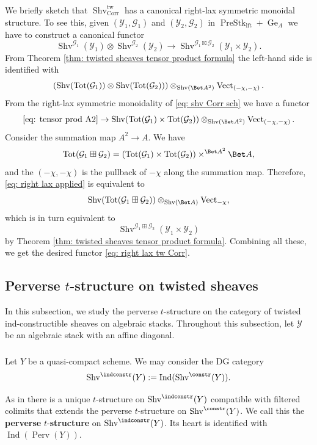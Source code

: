 \documentclass[10pt]{amsart}
\newcommand{\sssec}{\subsubsection}
\theoremstyle{remark}
\newcommand{\on}{\operatorname}
\newcommand{\cG}{\mathcal{G}}
\newcommand{\cY}{\mathcal{Y}}
\newcommand{\Perv}{\on{Perv}}
\newcommand{\Vect}{\on{Vect}}
\newcommand{\Shv}{\on{Shv}}
\newcommand{\PreStklft}{\on{PreStk}_{\on{lft}}}
\DeclareMathOperator{\Ind}{Ind}
\begin{document}
\sssec{}
We briefly sketch that $\Shv^{\on{tw}}_{\on{Corr}}$ has a canonical right-lax symmetric monoidal structure. To see this, given $(\cY_1,\cG_1)$ and $(\cY_2,\cG_2)$ in $\PreStklft+\on{Ge}_A$ we have to construct a canonical functor
\begin{equation}\label{eq: right lax tw Corr}
    \Shv^{\cG_1}(\cY_1)\otimes \Shv^{\cG_2}(\cY_2)\rightarrow \Shv^{\cG_1\boxtimes\cG_2}(\cY_1\times\cY_2).
\end{equation}
From Theorem \ref{thm: twisted sheaves tensor product formula} the left-hand side is identified with
\begin{equation}\label{eq: tensor prod A2}
    \left(\Shv(\on{Tot}(\cG_1))\otimes \Shv(\on{Tot}(\cG_2))\right)\otimes_{\Shv(\Bet A^2)}\Vect_{(-\chi,-\chi)}.
\end{equation}
From the right-lax symmetric monoidality of \eqref{eq: shv Corr sch} we have a functor
\begin{equation}\label{eq: right lax applied}
    \eqref{eq: tensor prod A2}\rightarrow \Shv(\on{Tot}(\cG_1)\times\on{Tot}(\cG_2))\otimes_{\Shv(\Bet A^2)}\Vect_{(-\chi,-\chi)}.
\end{equation}
Consider the summation map $A^2\rightarrow A$. We have 
\[\on{Tot}(\cG_1\boxplus\cG_2)=(\on{Tot}(\cG_1)\times\on{Tot}(\cG_2))\times^{\Bet A^2}\Bet A,\]
and the $(-\chi,-\chi)$ is the pullback of $-\chi$ along the summation map. Therefore, \eqref{eq: right lax applied} is equivalent to
\[
\Shv(\on{Tot}(\cG_1\boxplus\cG_2))\otimes_{\Shv(\Bet A)}\Vect_{-\chi},
\]
which is in turn equivalent to 
\[\Shv^{\cG_1\boxplus\cG_2}(\cY_1\times\cY_2)\]
by Theorem \ref{thm: twisted sheaves tensor product formula}. Combining all these, we get the desired functor \eqref{eq: right lax tw Corr}.

\subsection{Perverse $t$-structure on twisted sheaves}\label{ssec: t str twisting}
In this subsection, we study the perverse $t$-structure on the category of twisted ind-constructible sheaves on algebraic stacks. Throughout this subsection, let $\cY$ be an algebraic stack with an affine diagonal.


\sssec{}
Let $Y$ be a quasi-compact scheme. We may consider the DG category
\[\Shv^{\indconstr}(Y):=\Ind(\Shv^{\constr}(Y)).\]

As in \cite[Sect. 1.1.5]{AGKRRV} there is a unique $t$-structure on $\Shv^{\indconstr}(Y)$ compatible with filtered colimits that extends the perverse $t$-structure on $\Shv^{\constr}(Y)$. We call this the \textbf{perverse} $t$-\textbf{structure} on $\Shv^{\indconstr}(Y)$. Its heart is identified with $\Ind(\Perv(Y))$.
\medskip
\end{document}
